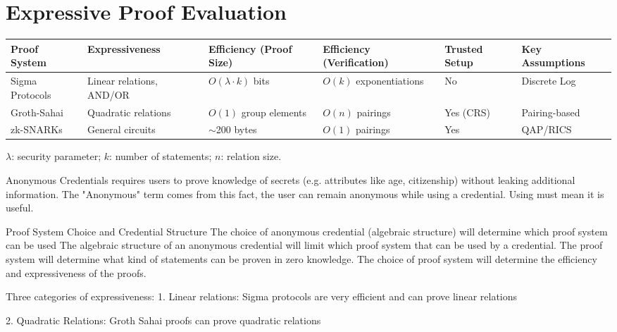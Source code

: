 \section{Expressive Proof Evaluation}\label{chap2:expressive_proofs}





\begin{tabular}{|p{2.5cm}|p{2.5cm}|p{3cm}|p{3cm}|p{2cm}|p{3cm}|}
\hline
\textbf{Proof System} & \textbf{Expressiveness} & \textbf{Efficiency (Proof Size)} & \textbf{Efficiency (Verification)} & \textbf{Trusted Setup} & \textbf{Key Assumptions} \\
\hline
Sigma Protocols & Linear relations, AND/OR & $O(\lambda \cdot k)$ bits & $O(k)$ exponentiations & No & Discrete Log \\
\hline
Groth-Sahai & Quadratic relations & $O(1)$ group elements & $O(n)$ pairings & Yes (CRS) & Pairing-based \\
\hline
zk-SNARKs & General circuits & $\sim$200 bytes & $O(1)$ pairings & Yes & QAP/RICS \\
\hline
\end{tabular}

\vspace{0.3cm}
\begin{center}
$\lambda$: security parameter; $k$: number of statements; $n$: relation size.
\end{center}

Anonymous Credentials requires users to prove knowledge of secrets (e.g. attributes like age, citizenship) without leaking additional information. The "Anonymous" term comes from this fact, the user can remain anonymous while using a credential. Using must mean it is useful.

Proof System Choice and Credential Structure
The choice of anonymous credential (algebraic structure) will determine which proof system can be used
The algebraic structure of an anonymous credential will limit which proof system that can be used by a credential. 
The proof system will determine what kind of statements can be proven in zero knowledge.
The choice of proof system will determine the efficiency and expressiveness of the proofs.


Three categories of expressiveness:
1. Linear relations: Sigma protocols are very efficient and can prove linear relations 

2. Quadratic Relations:  Groth Sahai proofs can prove quadratic relations

